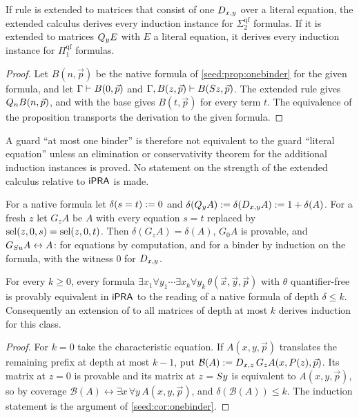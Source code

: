 \begin{corollary}\label{seed:cor:onebinder}
If rule  is extended to matrices that consist of one
$D_{x,y}$ over a literal equation, the extended calculus derives every
induction instance for $\Sigma_2^{\mathrm{qf}}$ formulas. If it is extended
to matrices $Q_{y}E$ with $E$ a literal equation, it derives every induction
instance for $\Pi_1^{\mathrm{qf}}$ formulas.
\end{corollary}

\begin{proof}
Let $B(n,\vec p)$ be the native formula of \cref{seed:prop:onebinder} for
the given formula, and let $\Gamma\vdash B(0,\vec p)$ and
$\Gamma,B(z,\vec p)\vdash B(S z,\vec p)$. The extended rule gives
$Q_{n}B(n,\vec p)$, and  with the base gives $B(t,\vec p)$ for
every term $t$. The equivalence of the proposition transports the
derivation to the given formula.
\end{proof}

A guard ``at most one binder'' is therefore not equivalent to the guard
``literal equation'' unless an elimination or conservativity theorem for the
additional induction instances is proved. No statement on the strength of
the extended calculus relative to $\mathsf{iPRA}$ is made.

For a native formula let $\delta(s=t)\mathrel{:=}0$ and
$\delta(Q_{y}A)\mathrel{:=}\delta(D_{x,y}A)\mathrel{:=}1+\delta(A)$. For a fresh $z$ let
$G_zA$ be $A$ with every equation $s=t$ replaced by
$\operatorname{sel}(z,0,s)=\operatorname{sel}(z,0,t)$. Then $\delta(G_zA)=\delta(A)$, $G_0A$ is
provable, and $G_{S u}A\leftrightarrow A$: for equations by computation,
and for a binder by induction on the formula, with the witness $0$ for
$D_{x,y}$.

\begin{theorem}\label{seed:thm:prefix}
For every $k\geq0$, every formula
$\exists x_1\forall y_1\cdots\exists x_k\forall y_k\,
\theta(\vec x,\vec y,\vec p)$ with $\theta$ quantifier-free is provably
equivalent in $\mathsf{iPRA}$ to the reading of a native formula of depth
$\delta\leq k$. Consequently an extension of  to all matrices
of depth at most $k$ derives induction for this class.
\end{theorem}

\begin{proof}
For $k=0$ take the characteristic equation. If $A(x,y,\vec p)$ translates
the remaining prefix at depth at most $k-1$, put
$\mathcal B(A)\mathrel{:=}D_{x,z}\,G_zA(x,P(z),\vec p)$. Its matrix at $z=0$ is
provable and its matrix at $z=S y$ is equivalent to $A(x,y,\vec p)$, so
by coverage $\mathcal B(A)\leftrightarrow\exists x\,\forall y\,A(x,y,\vec p)$,
and $\delta(\mathcal B(A))\leq k$. The induction statement is the argument
of \cref{seed:cor:onebinder}.
\end{proof}

